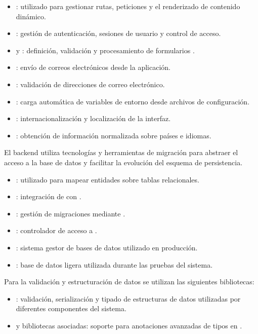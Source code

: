 \begin{itemize}
\tightlist
	\item {}:  utilizado para gestionar rutas, peticiones  y el renderizado de contenido dinámico.
	\item {}: gestión de autenticación, sesiones de usuario y control de acceso.
	\item {} y : definición, validación y procesamiento de formularios .
	\item {}: envío de correos electrónicos desde la aplicación.
	\item {}: validación de direcciones de correo electrónico.
	\item {}: carga automática de variables de entorno desde archivos de configuración.
	\item {}: internacionalización y localización de la interfaz.
	\item {}: obtención de información normalizada sobre países e idiomas.
\end{itemize}

El backend utiliza tecnologías  y herramientas de migración para abstraer el acceso a la base de datos y facilitar la evolución del esquema de persistencia.

\begin{itemize}
\tightlist
	\item {}:  utilizado para mapear entidades  sobre tablas relacionales.
	\item {}: integración de  con .
	\item {}: gestión de migraciones mediante .
	\item {}: controlador de acceso a .
	\item {}: sistema gestor de bases de datos utilizado en producción.
	\item {}: base de datos ligera utilizada durante las pruebas del sistema.
\end{itemize}

Para la validación y estructuración de datos se utilizan las siguientes bibliotecas:

\begin{itemize}
\tightlist
	\item {}: validación, serialización y tipado de estructuras de datos utilizadas por diferentes componentes del sistema.
	\item {} y bibliotecas asociadas: soporte para anotaciones avanzadas de tipos en .
\end{itemize}

